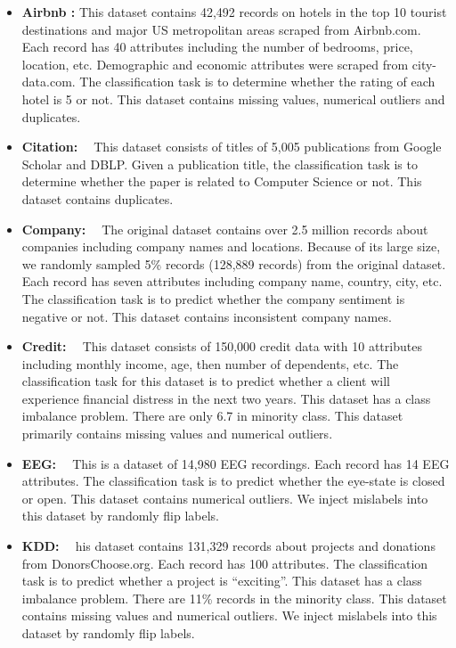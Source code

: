 \begin{itemize}
	\item {
	\textbf{Airbnb :} This dataset contains 42,492 records on hotels in the top
	10 tourist destinations and major US metropolitan areas scraped
	from Airbnb.com. Each record has 40 attributes including the number of bedrooms, price, location, etc. Demographic and economic attributes were scraped from city-data.com. The classification task is to determine whether the rating of each hotel is 5 or not. This
	dataset contains missing values, numerical outliers and duplicates.	
}

\item {
	\textbf{Citation: ~\cite{magellandata}} This dataset consists of titles of 5,005 publications from Google Scholar and DBLP. Given a publication title, the classification task is to determine whether the paper is related to Computer Science or not. This dataset contains duplicates.	
}

\item {
	\textbf{Company: ~\cite{Hatton2019}} The original dataset contains over 2.5 million records
	about companies including company names and locations. Because of its large size, we randomly sampled 5\% records (128,889
	records) from the original dataset. Each record has seven attributes including company name, country, city, etc. The classification task
	is to predict whether the company sentiment is negative or not. This dataset contains inconsistent company names.
}

\item {
	\textbf{Credit: ~\cite{Creditdataset2019}}
	This dataset consists of 150,000 credit data with 10
	attributes including monthly income, age, then number of dependents, etc. The classification task for this dataset is to predict whether
	a client will experience financial distress in the next two years. This
	dataset has a class imbalance problem. There are only 6.7%
	in minority class. This dataset primarily contains missing values
	and numerical outliers.
}

\item {
	\textbf{EEG: ~\cite{Dua:2019}}
	This is a dataset of 14,980 EEG recordings. Each record
	has 14 EEG attributes. The classification task is to predict whether
	the eye-state is closed or open. This dataset contains numerical outliers. We inject mislabels into this dataset by randomly flip labels.
}

\item {
	\textbf{KDD: ~\cite{KDDdataset2019}}
	his dataset contains 131,329 records about projects and
	donations from DonorsChoose.org. Each record has 100 attributes. The classification task is to predict whether a project is “exciting”.
	This dataset has a class imbalance problem. There are 11\% records
	in the minority class. This dataset contains missing values and numerical outliers. We inject mislabels into this dataset by randomly
	flip labels.
}


\end{itemize}
